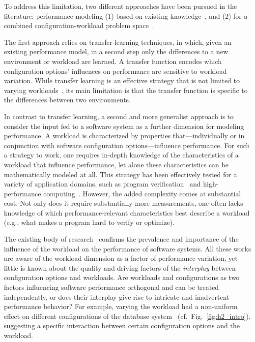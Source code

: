 To address this limitation, two different approaches have been pursued in the literature: performance modeling (1) based on existing knowledge~\cite{jamshidi_learning_2018,jamishidi_transfer_2017,jamshidi_transfer_gp_2017,martin_transfer_2021,ding_bayesian_2020}, and (2) for a combined configuration-workload problem space~\cite{koc_satune_2021,exastencils2014}.

The first approach relies on transfer-learning techniques, in which, given an existing performance model, in a second step only the differences to a new environment or workload are learned. A transfer function encodes which configuration options’ influences on performance are sensitive to workload variation. While transfer learning is an effective strategy that is not limited to varying workloads~\cite{jamshidi_learning_2018,jamishidi_transfer_2017,jamshidi_transfer_gp_2017,martin_transfer_2021,ding_bayesian_2020}, its main limitation is that the transfer function is specific to the differences between two environments.

In contrast to transfer learning, a second and more generalist approach is to consider the input fed to a software system as a further dimension for modeling performance. A workload is characterized by properties that---individually or in conjunction with software configuration options---influence performance. For such a strategy to work, one requires in-depth knowledge of the characteristics of a workload that influence performance, let alone these characteristics can be mathematically modeled at all. This strategy has been effectively tested for a  variety of application domains, such as program verification~\cite{koc_satune_2021} and high-performance computing~\cite{exastencils2014}. However, the added complexity comes at substantial cost. 
Not only does it require substantially more measurements, one often lacks knowledge of which performance-relevant characteristics best describe a workload (e.g., what makes a program hard to verify or optimize).

The existing body of research~\cite{dorn2020,siegmundPerformanceinfluenceModelsHighly2015,haDeepPerf2019,perfAL,guoVariabilityawarePerformancePrediction2013,sarkarCostEfficientSamplingPerformance,guo_2018_data,fourier_learning_2015,perLasso,chen_hinnperf_2022,chen_mmo_2021,nairUsingBadLearners2017,nairFlash18,ohFindingNearoptimalConfigurations2017} confirms the prevalence and importance of the influence of the workload on the performance of software systems. All these works are aware of the workload dimension as a factor of performance variation, yet little is known about the quality and driving factors of the \emph{interplay} between configuration options and workloads. Are workloads and configurations as two factors influencing software performance orthogonal and can be treated independently, or does their interplay give rise to intricate and inadvertent performance behavior? 
For example, varying the workload had a non-uniform effect on different configurations of the database system \htwo~(cf.~Fig.~\ref{fig:h2_intro}), suggesting a specific interaction between certain configuration options and the workload.


